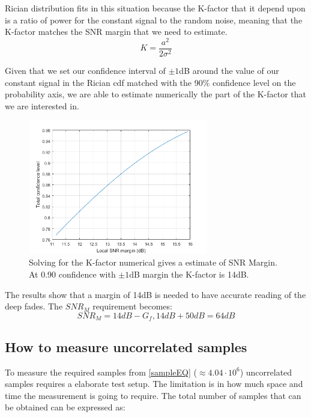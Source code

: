 \begin{where}
\end{where}

Rician distribution fits in this situation because the K-factor that it depend upon is a ratio of power for the constant signal to the random noise, meaning that the K-factor matches the \gls{SNR} margin that we need to estimate\cite[p.308]{Fading_Shadowing}.
\begin{equation}
K = \frac{a^2}{2\sigma^2}
\end{equation}

Given that we set our confidence interval of $\pm 1$dB around the value of our constant signal in the Rician cdf matched with the 90\% confidence level on the probability axis, we are able to estimate numerically the part of the K-factor that we are interested in.
\begin{figure}[H]
\centering
\includegraphics[width=0.70\textwidth]{figures/SNR_margin.png}
\caption{Solving for the K-factor numerical gives a estimate of SNR Margin. At 0.90 confidence with $\pm 1$dB margin  the K-factor is 14dB.}
\label{Rician_90}
\end{figure}

The results show that a margin of 14dB is needed to have accurate reading of the deep fades.
The $SNR_M$ requirement becomes:
\begin{equation}
SNR_M = 14dB - G_f , 14dB + 50dB = 64dB 
\end{equation}
\begin{where}
\end{where}


\subsection{How to measure uncorrelated samples}
\label{howtomeasureUS}
To measure the required samples from \autoref{sampleEQ} ($\approx 4.04\cdot10^6$) uncorrelated samples requires a elaborate test setup. The limitation is in how much space and time the measurement is going to require. The total number of samples that can be obtained can be expressed as: 

